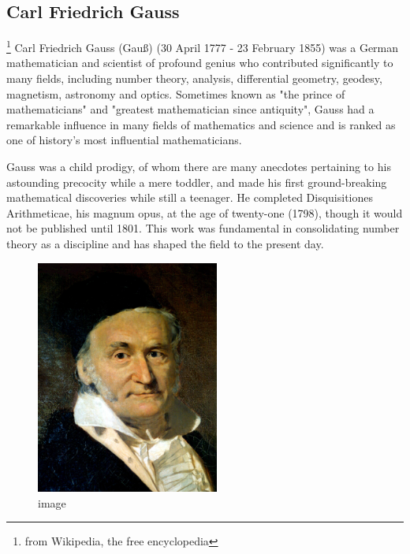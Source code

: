 \documentclass[
  letterpaper,
  DIV=11,
  numbers=noendperiod]{scrartcl}
\theoremstyle{remark}
\begin{document}
\subsection{Carl Friedrich Gauss}\label{carl-friedrich-gauss}

\footnote{from Wikipedia, the free encyclopedia}
\label{Gauss}{} Carl Friedrich Gauss (Gauß) (30 April
1777 - 23 February 1855) was a German mathematician and scientist of
profound genius who contributed significantly to many fields, including
number theory, analysis, differential geometry, geodesy, magnetism,
astronomy and optics. Sometimes known as "the prince of mathematicians"
and "greatest mathematician since antiquity", Gauss had a remarkable
influence in many fields of mathematics and science and is ranked as one
of history's most influential mathematicians.

Gauss was a child prodigy, of whom there are many anecdotes pertaining
to his astounding precocity while a mere toddler, and made his first
ground-breaking mathematical discoveries while still a teenager. He
completed Disquisitiones Arithmeticae, his magnum opus, at the age of
twenty-one (1798), though it would not be published until 1801. This
work was fundamental in consolidating number theory as a discipline and
has shaped the field to the present day.

\begin{figure}[H]

{\centering \includegraphics[width=6cm,height=\textheight,keepaspectratio]{Gauss.jpg}

}

\caption{image}

\end{figure}%
\end{document}

